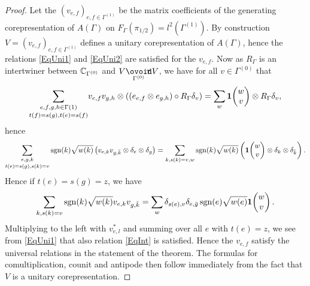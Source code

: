 \begin{proof} Let the $(v_{e,f})_{e,f\in \Gamma^{(1)}}$ be the matrix coefficients of the generating corepresentation of $A(\Gamma)$ on $F_{\Gamma}(\pi_{1/2}) = l^2(\Gamma^{(1)})$. By construction $V = (v_{e,f})_{e,f\in \Gamma^{(1)}}$ defines a unitary corepresentation of $A(\Gamma)$, hence the relations \eqref{EqUni1} and \eqref{EqUni2} are satisfied for the $v_{e,f}$. Now as $R_{\Gamma}$ is an intertwiner between $\mathbb{C}_{\Gamma^{(0)}}$ and $V\Circtv{\Gamma^{(0)}} V$, we have for all $v\in \Gamma^{(0)}$ that \[\underset{t(f)=s(g),t(e)=s(f)}{\sum_{e,f,g,h\in \Gamma{(1)}}} v_{e,f}v_{g,h}\otimes \left((e_{e,f}\otimes e_{g,h})\circ R_{\Gamma} \delta_v\right) = \sum_w \mathbf{1}\!\begin{pmatrix} w \\ v\end{pmatrix}\otimes R_{\Gamma}\delta_v,\] hence
\[\underset{t(e)=s(g),s(k)=v}{\sum_{e,g,k}} \operatorname{\mathrm{sgn}}(k)\sqrt{w(k)}\left( v_{e,k}v_{g,\bar{k}} \otimes \delta_e\otimes \delta_{g}\right) =\sum_{k,s(k)=v,w}\operatorname{\mathrm{sgn}}(k)\sqrt{w(k)} \left(\mathbf{1}\!\begin{pmatrix} w \\ v\end{pmatrix} \otimes \delta_k\otimes \delta_{\bar{k}}\right).\] Hence if $t(e) = s(g)=z$, we have \[\sum_{k,s(k)=v} \operatorname{\mathrm{sgn}}(k)\sqrt{w(k)} v_{e,k}v_{g,\bar{k}} =\sum_w \delta_{s(e),v} \delta_{e,\bar{g}} \operatorname{\mathrm{sgn}}(e)\sqrt{w(e)}\mathbf{1}\!\begin{pmatrix} w \\ v\end{pmatrix}.\] Multiplying to the left with $v_{e,l}^*$ and summing over all $e$ with $t(e) = z$, we see from \eqref{EqUni1} that also relation \eqref{EqInt} is satisfied. Hence the $v_{e,f}$ satisfy the universal relations in the statement of the theorem. The formulas for comultiplication, counit and antipode then follow immediately from the fact that $V$ is a unitary corepresentation.


\end{proof}
